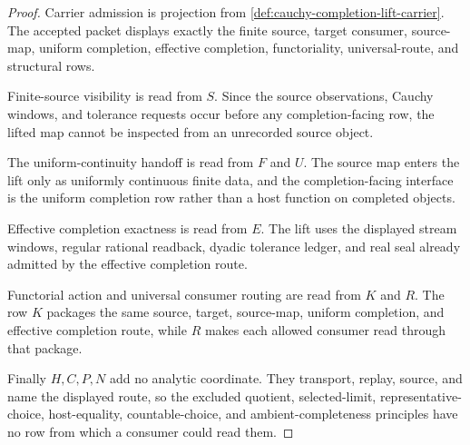\begin{proof}
Carrier admission is projection from \autoref{def:cauchy-completion-lift-carrier}. The accepted packet displays exactly the finite source, target consumer, source-map, uniform completion, effective completion, functoriality, universal-route, and structural rows.

Finite-source visibility is read from $S$. Since the source observations, Cauchy windows, and tolerance requests occur before any completion-facing row, the lifted map cannot be inspected from an unrecorded source object.

The uniform-continuity handoff is read from $F$ and $U$. The source map enters the lift only as uniformly continuous finite data, and the completion-facing interface is the uniform completion row rather than a host function on completed objects.

Effective completion exactness is read from $E$. The lift uses the displayed stream windows, regular rational readback, dyadic tolerance ledger, and real seal already admitted by the effective completion route.

Functorial action and universal consumer routing are read from $K$ and $R$. The row $K$ packages the same source, target, source-map, uniform completion, and effective completion route, while $R$ makes each allowed consumer read through that package.

Finally $H,C,P,N$ add no analytic coordinate. They transport, replay, source, and name the displayed route, so the excluded quotient, selected-limit, representative-choice, host-equality, countable-choice, and ambient-completeness principles have no row from which a consumer could read them.
\end{proof}

